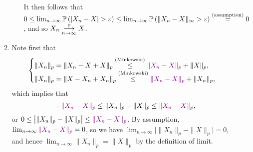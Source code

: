 \begin{enumerate}
\begin{pf}
\begin{enumerate}
\begin{itemize}
It then follows that \(0\le\lim_{n\to\infty}\prob{|X_n-X|>\varepsilon}
\le\lim_{n\to\infty}\prob{\|X_n-X\|_{\infty}>\varepsilon}\overset{\text{(assumption)}}{=}0\),
and so \(X_n\underset{n\to\infty}{\overset{\text{p}}{\longrightarrow}} X\).
\end{itemize}
\item Note first that
\[
\begin{cases}
\|X_n\|_{p}=\|X_n-X+X\|_{p}\overset{\text{(Minkowski)}}{\le}\vc{\|X_n-X\|_{p}}+\|X\|_{p}, \\
\|X_n\|_{p}=\|X-X_n+X_n\|_{p}\overset{\text{(Minkowski)}}{\le}\vc{\|X_n-X\|_{p}}+\|X_n\|_{p},
\end{cases}
\]
which implies that
\[
-\vc{\|X_n-X\|_{p}}\le \|X_{n}\|_{p}-\|X\|_{p}\le \vc{\|X_{n}-X\|_{p}},
\]
or \(0\le \bigl|\|X_{n}\|_{p}-\|X\|_{p}\bigr|\le\vc{\|X_{n}-X\|_{p}}\). By
assumption, \(\lim_{n\to\infty}\vc{\|X_{n}-X\|_{p}}=0\), so we have
\(\lim_{n\to\infty}\bigl|\|X_{n}\|_{p}-\|X\|_{p}\bigr|=0\), and hence
\(\lim_{n\to\infty}\|X_{n}\|_{p}=\|X\|_{p}\) by the definition of limit.
\end{enumerate}
\end{pf}
\end{enumerate}
